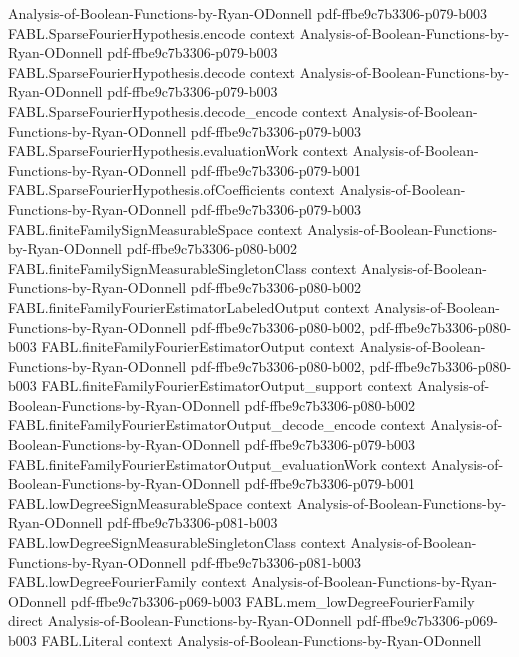 \begin{theorem}
  {Analysis-of-Boolean-Functions-by-Ryan-ODonnell}
  {pdf-ffbe9c7b3306-p079-b003}
\proofstep
  {FABL.SparseFourierHypothesis.encode}
  {context}
  {Analysis-of-Boolean-Functions-by-Ryan-ODonnell}
  {pdf-ffbe9c7b3306-p079-b003}
\proofstep
  {FABL.SparseFourierHypothesis.decode}
  {context}
  {Analysis-of-Boolean-Functions-by-Ryan-ODonnell}
  {pdf-ffbe9c7b3306-p079-b003}
\proofstep
  {FABL.SparseFourierHypothesis.decode_encode}
  {context}
  {Analysis-of-Boolean-Functions-by-Ryan-ODonnell}
  {pdf-ffbe9c7b3306-p079-b003}
\proofstep
  {FABL.SparseFourierHypothesis.evaluationWork}
  {context}
  {Analysis-of-Boolean-Functions-by-Ryan-ODonnell}
  {pdf-ffbe9c7b3306-p079-b001}
\proofstep
  {FABL.SparseFourierHypothesis.ofCoefficients}
  {context}
  {Analysis-of-Boolean-Functions-by-Ryan-ODonnell}
  {pdf-ffbe9c7b3306-p079-b003}
\proofstep
  {FABL.finiteFamilySignMeasurableSpace}
  {context}
  {Analysis-of-Boolean-Functions-by-Ryan-ODonnell}
  {pdf-ffbe9c7b3306-p080-b002}
\proofstep
  {FABL.finiteFamilySignMeasurableSingletonClass}
  {context}
  {Analysis-of-Boolean-Functions-by-Ryan-ODonnell}
  {pdf-ffbe9c7b3306-p080-b002}
\proofstep
  {FABL.finiteFamilyFourierEstimatorLabeledOutput}
  {context}
  {Analysis-of-Boolean-Functions-by-Ryan-ODonnell}
  {pdf-ffbe9c7b3306-p080-b002,
    pdf-ffbe9c7b3306-p080-b003}
\proofstep
  {FABL.finiteFamilyFourierEstimatorOutput}
  {context}
  {Analysis-of-Boolean-Functions-by-Ryan-ODonnell}
  {pdf-ffbe9c7b3306-p080-b002,
    pdf-ffbe9c7b3306-p080-b003}
\proofstep
  {FABL.finiteFamilyFourierEstimatorOutput_support}
  {context}
  {Analysis-of-Boolean-Functions-by-Ryan-ODonnell}
  {pdf-ffbe9c7b3306-p080-b002}
\proofstep
  {FABL.finiteFamilyFourierEstimatorOutput_decode_encode}
  {context}
  {Analysis-of-Boolean-Functions-by-Ryan-ODonnell}
  {pdf-ffbe9c7b3306-p079-b003}
\proofstep
  {FABL.finiteFamilyFourierEstimatorOutput_evaluationWork}
  {context}
  {Analysis-of-Boolean-Functions-by-Ryan-ODonnell}
  {pdf-ffbe9c7b3306-p079-b001}
\proofstep
  {FABL.lowDegreeSignMeasurableSpace}
  {context}
  {Analysis-of-Boolean-Functions-by-Ryan-ODonnell}
  {pdf-ffbe9c7b3306-p081-b003}
\proofstep
  {FABL.lowDegreeSignMeasurableSingletonClass}
  {context}
  {Analysis-of-Boolean-Functions-by-Ryan-ODonnell}
  {pdf-ffbe9c7b3306-p081-b003}
\proofstep
  {FABL.lowDegreeFourierFamily}
  {context}
  {Analysis-of-Boolean-Functions-by-Ryan-ODonnell}
  {pdf-ffbe9c7b3306-p069-b003}
\proofstep
  {FABL.mem_lowDegreeFourierFamily}
  {direct}
  {Analysis-of-Boolean-Functions-by-Ryan-ODonnell}
  {pdf-ffbe9c7b3306-p069-b003}
\proofstep
  {FABL.Literal}
  {context}
  {Analysis-of-Boolean-Functions-by-Ryan-ODonnell}

\end{theorem}
